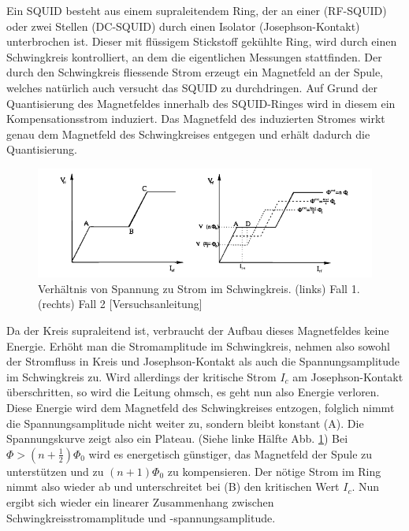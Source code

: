 Ein SQUID besteht aus einem supraleitendem Ring, der an einer (RF-SQUID) oder zwei Stellen (DC-SQUID) durch einen Isolator (Josephson-Kontakt) unterbrochen ist. Dieser mit flüssigem Stickstoff gekühlte Ring, wird durch einen Schwingkreis kontrolliert, an dem die eigentlichen Messungen stattfinden. Der durch den Schwingkreis fliessende Strom erzeugt ein Magnetfeld an der Spule, welches natürlich auch versucht das SQUID zu durchdringen. Auf Grund der Quantisierung des Magnetfeldes innerhalb des SQUID-Ringes wird in diesem ein Kompensationsstrom induziert. Das Magnetfeld des induzierten Stromes wirkt genau dem Magnetfeld des Schwingkreises entgegen und erhält dadurch die Quantisierung.

\begin{figure}
 \includegraphics[width=\linewidth]{Bilder/strom-spannung-squid.png}
 \caption{ Verhältnis von Spannung zu Strom im Schwingkreis. (links) Fall 1. (rechts) Fall 2 [Versuchsanleitung]}
 \label{strom-spannung-squid}
\end{figure}

Da der Kreis supraleitend ist, verbraucht der Aufbau dieses Magnetfeldes keine Energie. Erhöht man die Stromamplitude im Schwingkreis, nehmen also sowohl der Stromfluss in Kreis und Josephson-Kontakt als auch die Spannungsamplitude im Schwingkreis zu. Wird allerdings der kritische Strom $I_c$ am Josephson-Kontakt überschritten, so wird die Leitung ohmsch, es geht nun also Energie verloren. Diese Energie wird dem Magnetfeld des Schwingkreises entzogen, folglich nimmt die Spannungsamplitude nicht weiter zu, sondern bleibt konstant (A). Die Spannungskurve zeigt also ein Plateau. (Siehe linke Hälfte Abb. \ref{strom-spannung-squid}) Bei $ \Phi > \left(n+\frac{1}{2}\right) \Phi_0 $ wird es energetisch günstiger, das Magnetfeld der Spule zu unterstützen und zu $\left(n+1\right) \Phi_0$ zu kompensieren. Der nötige Strom im Ring nimmt also wieder ab und unterschreitet bei (B) den kritischen Wert $I_c$. Nun ergibt sich wieder ein linearer Zusammenhang zwischen Schwingkreisstromamplitude und -spannungsamplitude.

